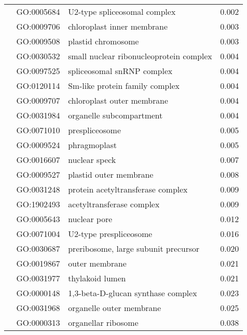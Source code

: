 \begin{longtable}{lllr}
   & GO:0005684 &                 U2-type spliceosomal complex &         0.002 \\
   & GO:0009706 &                   chloroplast inner membrane &         0.003 \\
   & GO:0009508 &                           plastid chromosome &         0.003 \\
   & GO:0030532 &      small nuclear ribonucleoprotein complex &         0.004 \\
   & GO:0097525 &                   spliceosomal snRNP complex &         0.004 \\
   & GO:0120114 &               Sm-like protein family complex &         0.004 \\
   & GO:0009707 &                   chloroplast outer membrane &         0.004 \\
   & GO:0031984 &                     organelle subcompartment &         0.004 \\
   & GO:0071010 &                               prespliceosome &         0.005 \\
   & GO:0009524 &                                 phragmoplast &         0.005 \\
   & GO:0016607 &                                nuclear speck &         0.007 \\
   & GO:0009527 &                       plastid outer membrane &         0.008 \\
   & GO:0031248 &            protein acetyltransferase complex &         0.009 \\
   & GO:1902493 &                    acetyltransferase complex &         0.009 \\
   & GO:0005643 &                                 nuclear pore &         0.012 \\
   & GO:0071004 &                       U2-type prespliceosome &         0.016 \\
   & GO:0030687 &         preribosome, large subunit precursor &         0.020 \\
   & GO:0019867 &                               outer membrane &         0.021 \\
   & GO:0031977 &                              thylakoid lumen &         0.021 \\
   & GO:0000148 &           1,3-beta-D-glucan synthase complex &         0.023 \\
   & GO:0031968 &                     organelle outer membrane &         0.025 \\
   & GO:0000313 &                          organellar ribosome &         0.038 \\

\end{longtable}
